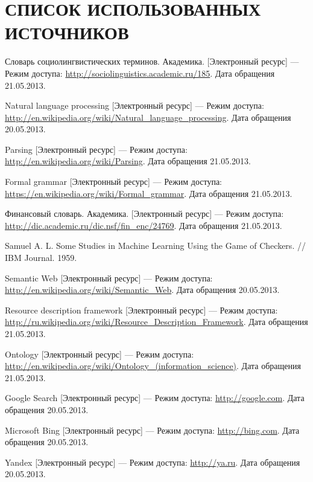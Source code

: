 \renewcommand*{\refname}{}
\section*{\centering СПИСОК ИСПОЛЬЗОВАННЫХ ИСТОЧНИКОВ}
\begin{thebibliography}{99}	
	Словарь социолингвистических терминов. Академика. [Электронный ресурс] --- Режим доступа: \url{http://sociolinguistics.academic.ru/185}. Дата обращения 21.05.2013.

	Natural language processing [Электронный ресурс] --- Режим доступа: \url{http://en.wikipedia.org/wiki/Natural_language_processing}. Дата обращения 20.05.2013.	

	Parsing [Электронный ресурс] --- Режим доступа: \url{http://en.wikipedia.org/wiki/Parsing}. Дата обращения 21.05.2013.	

	Formal grammar [Электронный ресурс] --- Режим доступа: \url{https://en.wikipedia.org/wiki/Formal_grammar}. Дата обращения 21.05.2013.

	Финансовый словарь. Академика. [Электронный ресурс] --- Режим доступа: \url{http://dic.academic.ru/dic.nsf/fin_enc/24769}. Дата обращения 21.05.2013.

	Samuel A. L. Some Studies in Machine Learning Using the Game of Checkers. // IBM Journal. 1959.	

	Semantic Web [Электронный ресурс] --- Режим доступа: \url{http://en.wikipedia.org/wiki/Semantic_Web}. Дата обращения 20.05.2013.	

	Resource description framework [Электронный ресурс] --- Режим доступа: \url{http://ru.wikipedia.org/wiki/Resource_Description_Framework}. Дата обращения 21.05.2013.	

	Ontology [Электронный ресурс] --- Режим доступа: \url{http://en.wikipedia.org/wiki/Ontology_(information_science)}. Дата обращения 21.05.2013. 

	Google Search [Электронный ресурс] --- Режим доступа: \url{http://google.com}. Дата обращения 20.05.2013.

	Microsoft Bing [Электронный ресурс] --- Режим доступа: \url{http://bing.com}. Дата обращения 20.05.2013.

	Yandex [Электронный ресурс] --- Режим доступа: \url{http://ya.ru}. Дата обращения 20.05.2013.


\end{thebibliography}
